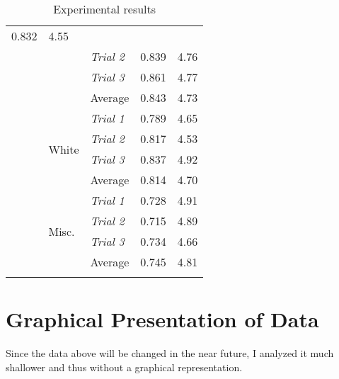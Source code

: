 \begin{longtable}{@{}lllll@{}}
      0.832 &
      4.55 \\
    \multicolumn{1}{l|}{} &
      \multicolumn{1}{l|}{} &
      \textit{Trial 2} &
      0.839 &
      4.76 \\
    \multicolumn{1}{l|}{} &
      \multicolumn{1}{l|}{} &
      \textit{Trial 3} &
      0.861 &
      4.77 \\
    \multicolumn{1}{l|}{} &
      \multicolumn{1}{l|}{} &
      Average &
      0.843 &
      4.73 \\
    \multicolumn{1}{l|}{} &
      \multicolumn{1}{l|}{\multirow{4}{*}{White}} &
      \textit{Trial 1} &
      0.789 &
      4.65 \\
    \multicolumn{1}{l|}{} &
      \multicolumn{1}{l|}{} &
      \textit{Trial 2} &
      0.817 &
      4.53 \\
    \multicolumn{1}{l|}{} &
      \multicolumn{1}{l|}{} &
      \textit{Trial 3} &
      0.837 &
      4.92 \\
    \multicolumn{1}{l|}{} &
      \multicolumn{1}{l|}{} &
      Average &
      0.814 &
      4.70 \\
    \multicolumn{1}{l|}{} &
      \multicolumn{1}{l|}{\multirow{4}{*}{Misc.}} &
      \textit{Trial 1} &
      0.728 &
      4.91 \\
    \multicolumn{1}{l|}{} &
      \multicolumn{1}{l|}{} &
      \textit{Trial 2} &
      0.715 &
      4.89 \\
    \multicolumn{1}{l|}{} &
      \multicolumn{1}{l|}{} &
      \textit{Trial 3} &
      0.734 &
      4.66 \\
    \multicolumn{1}{l|}{} &
      \multicolumn{1}{l|}{} &
      Average &
      0.745 &
      4.81 \\
    \caption{Experimental results}
    \label{tab:datatable}
\end{longtable}


\section{Graphical Presentation of Data}

Since the data above will be changed in the near future, I analyzed it much shallower and thus without a graphical representation.